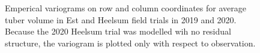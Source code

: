 \begin{figure}[H]

{\centering {}

}

\caption{Emperical variograms on row and column coordinates for average
tuber volume in Est and Heelsum field trials in 2019 and 2020. Because
the 2020 Heelsum trial was modelled wih no residual structure, the
variogram is plotted only with respect to observation.}

\end{figure}%

